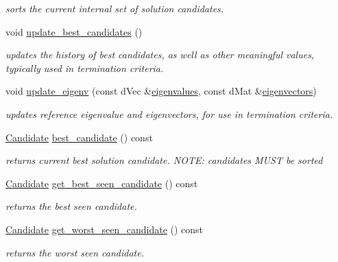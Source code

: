 \begin{DoxyCompactItemize}
\begin{DoxyCompactList}\small\item\em sorts the current internal set of solution candidates. \end{DoxyCompactList}\item 
void \hyperlink{classlibcmaes_1_1CMASolutions_a207c159be5f8668f018d564a1adb8dc8}{update\+\_\+best\+\_\+candidates} ()
\begin{DoxyCompactList}\small\item\em updates the history of best candidates, as well as other meaningful values, typically used in termination criteria. \end{DoxyCompactList}\item 
void \hyperlink{classlibcmaes_1_1CMASolutions_a28a20c0a90712e4f28038af2a4bd320b}{update\+\_\+eigenv} (const d\+Vec \&\hyperlink{classlibcmaes_1_1CMASolutions_add38348a9496b9559e72a020b952a262}{eigenvalues}, const d\+Mat \&\hyperlink{classlibcmaes_1_1CMASolutions_a30bed04a6b034e834f1a2e74349de8af}{eigenvectors})
\begin{DoxyCompactList}\small\item\em updates reference eigenvalue and eigenvectors, for use in termination criteria. \end{DoxyCompactList}\item 
\hyperlink{classlibcmaes_1_1Candidate}{Candidate} \hyperlink{classlibcmaes_1_1CMASolutions_a218f2ee7bbd91d385f23082bfe18b1d9}{best\+\_\+candidate} () const 
\begin{DoxyCompactList}\small\item\em returns current best solution candidate. N\+O\+T\+E\+: candidates M\+U\+S\+T be sorted \end{DoxyCompactList}\item 
\hyperlink{classlibcmaes_1_1Candidate}{Candidate} \hyperlink{classlibcmaes_1_1CMASolutions_a03350b521b893166e453cbeb634fdf9f}{get\+\_\+best\+\_\+seen\+\_\+candidate} () const 
\begin{DoxyCompactList}\small\item\em returns the best seen candidate. \end{DoxyCompactList}\item 
\hyperlink{classlibcmaes_1_1Candidate}{Candidate} \hyperlink{classlibcmaes_1_1CMASolutions_a7c4130272eceb3aefb9f6634bef31055}{get\+\_\+worst\+\_\+seen\+\_\+candidate} () const 
\begin{DoxyCompactList}\small\item\em returns the worst seen candidate. \end{DoxyCompactList}\item 

\end{DoxyCompactItemize}
